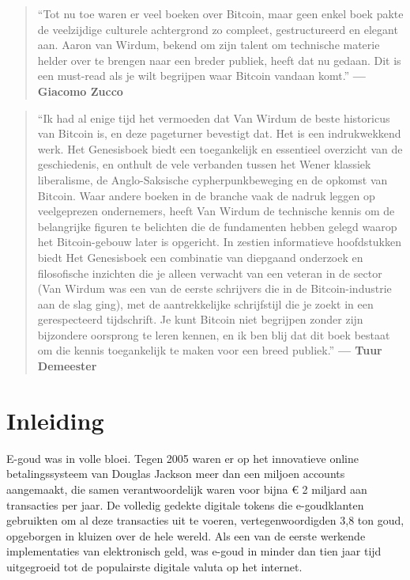 \documentclass[
  a5paper,
  smalldemyvopaper,11pt,twoside,onecolumn,openright,extrafontsizes]{memoir}
\begin{document}
\begin{quote}
``Tot nu toe waren er veel boeken over Bitcoin, maar geen enkel boek
pakte de veelzijdige culturele achtergrond zo compleet, gestructureerd
en elegant aan. Aaron van Wirdum, bekend om zijn talent om technische
materie helder over te brengen naar een breder publiek, heeft dat nu
gedaan. Dit is een must-read als je wilt begrijpen waar Bitcoin vandaan
komt.'' \textbf{--- Giacomo Zucco}
\end{quote}

\begin{quote}
``Ik had al enige tijd het vermoeden dat Van Wirdum de beste historicus
van Bitcoin is, en deze pageturner bevestigt dat. Het is een
indrukwekkend werk. Het Genesisboek biedt een toegankelijk en essentieel
overzicht van de geschiedenis, en onthult de vele verbanden tussen het
Wener klassiek liberalisme, de Anglo-Saksische cypherpunkbeweging en de
opkomst van Bitcoin. Waar andere boeken in de branche vaak de nadruk
leggen op veelgeprezen ondernemers, heeft Van Wirdum de technische
kennis om de belangrijke figuren te belichten die de fundamenten hebben
gelegd waarop het Bitcoin-gebouw later is opgericht. In zestien
informatieve hoofdstukken biedt Het Genesisboek een combinatie van
diepgaand onderzoek en filosofische inzichten die je alleen verwacht van
een veteran in de sector (Van Wirdum was een van de eerste schrijvers
die in de Bitcoin-industrie aan de slag ging), met de aantrekkelijke
schrijfstijl die je zoekt in een gerespecteerd tijdschrift. Je kunt
Bitcoin niet begrijpen zonder zijn bijzondere oorsprong te leren kennen,
en ik ben blij dat dit boek bestaat om die kennis toegankelijk te maken
voor een breed publiek.'' \textbf{--- Tuur Demeester}
\end{quote}


\chapter*{Inleiding}\label{inleiding}


E-goud was in volle bloei. Tegen 2005 waren er op het innovatieve online
betalingssysteem van Douglas Jackson meer dan een miljoen accounts
aangemaakt, die samen verantwoordelijk waren voor bijna € 2 miljard aan
transacties per jaar. De volledig gedekte digitale tokens die
e-goudklanten gebruikten om al deze transacties uit te voeren,
vertegenwoordigden 3,8 ton goud, opgeborgen in kluizen over de hele
wereld. Als een van de eerste werkende implementaties van elektronisch
geld, was e-goud in minder dan tien jaar tijd uitgegroeid tot de
populairste digitale valuta op het internet.
\end{document}
